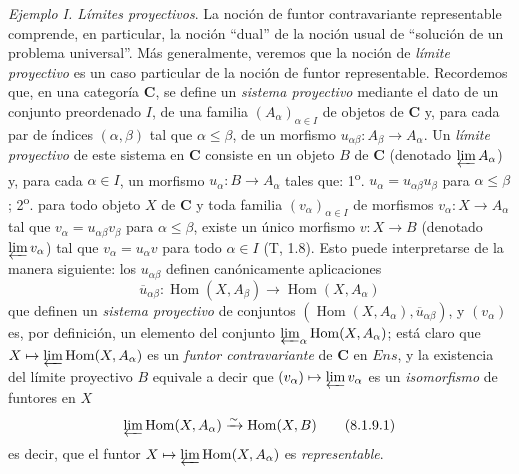 \begin{env}[8.1.9]
\label{0.8.1.9}
\label{0.8.1.9-fr}
\textit{Ejemplo I. Límites proyectivos}.
La noción de funtor contravariante representable comprende, en particular, la noción ``dual'' de la noción usual de ``solución de un problema universal''.
Más generalmente, veremos que la noción de \emph{límite proyectivo} es un caso particular de la noción de funtor representable.
Recordemos que, en una categoría $\boldsymbol{C}$, se define un \emph{sistema proyectivo} mediante el dato de un conjunto preordenado $I$, de una familia $(A_\alpha)_{\alpha\in I}$ de objetos de $\boldsymbol{C}$ y, para cada par de índices $(\alpha,\beta)$ tal que $\alpha\leq\beta$, de un morfismo $u_{\alpha\beta}:A_\beta\to A_\alpha$.
Un \emph{límite proyectivo} de este sistema en $\boldsymbol{C}$ consiste en un objeto $B$ de $\boldsymbol{C}$ (denotado $\varprojlim A_\alpha$) y, para cada $\alpha\in I$, un morfismo $u_\alpha:B\to A_\alpha$ tales que: 1\textsuperscript{o}. $u_\alpha=u_{\alpha\beta}u_\beta$ para $\alpha\leq\beta$; 2\textsuperscript{o}. para todo objeto $X$ de $\boldsymbol{C}$ y toda familia $(v_\alpha)_{\alpha\in I}$ de morfismos $v_\alpha:X\to A_\alpha$ tal que $v_\alpha=u_{\alpha\beta}v_\beta$ para $\alpha\leq\beta$, existe un único morfismo $v:X\to B$ (denotado $\varprojlim v_\alpha$) tal que $v_\alpha=u_\alpha v$ para todo $\alpha\in I$ (T, 1.8).
Esto puede interpretarse de la manera siguiente: los $u_{\alpha\beta}$ definen canónicamente aplicaciones
\[
  \overline{u}_{\alpha\beta}:\operatorname{Hom}(X,A_\beta)
  \to\operatorname{Hom}(X,A_\alpha)
\]
que definen un \emph{sistema proyectivo} de conjuntos $(\operatorname{Hom}(X,A_\alpha),\overline{u}_{\alpha\beta})$, y $(v_\alpha)$ es, por definición, un elemento del conjunto $\varprojlim_\alpha\operatorname{Hom}(X,A_\alpha)$; está claro que $X\mapsto\varprojlim\operatorname{Hom}(X,A_\alpha)$ es un \emph{funtor contravariante} de $\boldsymbol{C}$ en $\boldsymbol{\mathit{Ens}}$, y la existencia del límite proyectivo $B$ equivale a decir que $(v_\alpha)\mapsto\varprojlim v_\alpha$ es un \emph{isomorfismo} de funtores en $X$
\[
  \varprojlim\operatorname{Hom}(X,A_\alpha)
  \xrightarrow{\sim}\operatorname{Hom}(X,B)
  \tag{8.1.9.1}
\]
es decir, que el funtor $X\mapsto\varprojlim\operatorname{Hom}(X,A_\alpha)$ es \emph{representable}.
\end{env}

